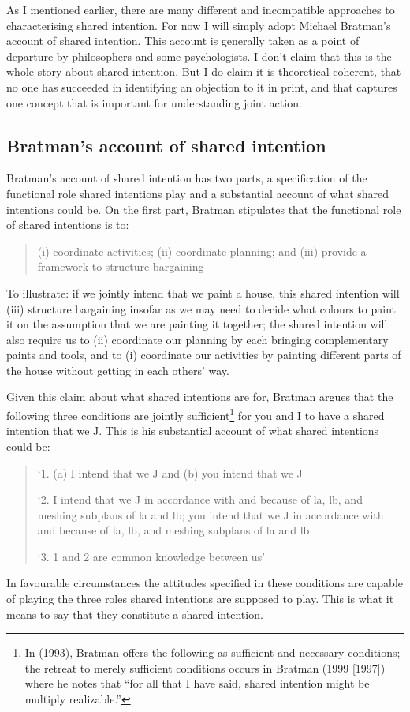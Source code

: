 \documentclass[12pt,a4paper]{extarticle}
\begin{document}
As I mentioned earlier, there are many different and incompatible approaches to characterising shared intention.  
For now I will simply adopt Michael Bratman's account of shared intention.  
This account is generally taken as a point of departure by philosophers and some psychologists.
I don't claim that this is the whole story about shared intention.
But I do claim it is theoretical coherent, 
that no one has succeeded in identifying an objection to it in print, 
and that captures one  concept that is important for understanding joint action.

\subsection{Bratman's account of shared intention}

Bratman's account of shared intention has two parts, a specification of the functional role shared intentions play and a substantial account of what shared intentions could be.  On the first part, Bratman stipulates that the functional role of shared intentions is to: 
%
\begin{quote}
(i) coordinate activities; (ii) coordinate planning; and (iii) provide a framework to structure bargaining \citep[p.\ 99]{Bratman:1993je}
\end{quote}
%
To illustrate: if we jointly intend that we paint a house, this shared intention will (iii) structure bargaining insofar as we may need to decide what colours to paint it on the assumption that we are painting it together; the shared intention will also require us to (ii) coordinate our planning by each bringing complementary paints and tools, and to (i) coordinate our activities by painting different parts of the house without getting in each others’ way.

Given this claim about what shared intentions are for, Bratman argues that the following three conditions are jointly sufficient\footnote{
In (1993), Bratman offers the following as sufficient and necessary conditions; the retreat to merely sufficient conditions occurs in Bratman (1999 [1997]) where he notes that “for all that I have said, shared intention might be multiply realizable.”
}  
for you and I to have a shared intention that we J.  This is his substantial account of what shared intentions could be:
%
\begin{quote}
`1. (a) I intend that we J and (b) you intend that we J

`2. I intend that we J in accordance with and because of la, lb, and meshing subplans of la and lb; you intend that we J in accordance with and because of la, lb, and meshing subplans of la and lb

`3. 1 and 2 are common knowledge between us' \citep[View 4]{Bratman:1993je}
\end{quote}
%
In favourable circumstances the attitudes specified in these conditions are capable of playing the three roles shared intentions are supposed to play.  This is what it means to say that they constitute a shared intention.
\end{document}
